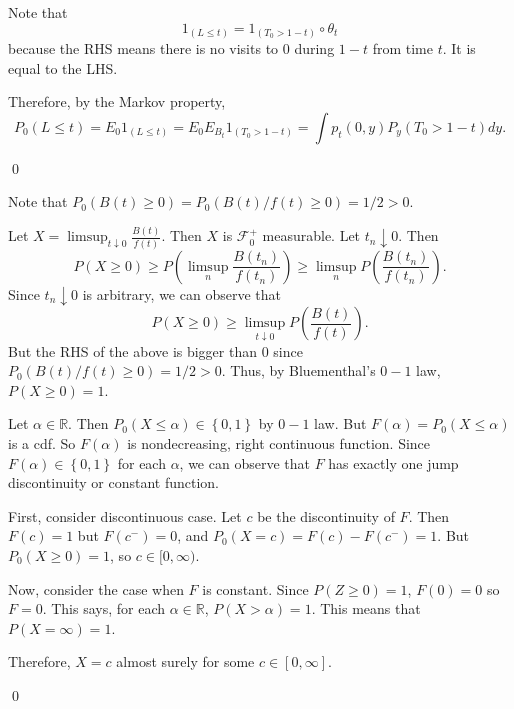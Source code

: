 \begin{problem}[7.2.2] \hfill

	Note that 
	\[
		1_{(L \le t)} = 1_{(T_0 > 1-t)} \circ \theta_t
	\]
	because the RHS means there is no visits to $0$ during $1-t$ from time $t$.
	It is equal to the LHS.

	Therefore, by the Markov property,
	\[
		P_0\left( L \le t \right)
		= E_0 1_{(L\le t)}
		= E_0 E_{B_t}1_{(T_0 > 1-t)}
		= \int p_t(0, y)P_y(T_0 > 1-t) dy.
	\]

	\qed
\end{problem}

\begin{problem}[7.2.4] \hfill

	Note that $P_0 (B(t) \ge 0) = P_0\left( B(t) / f(t) \ge 0 \right) = 1/2 >0$.

	Let $X = \limsup_{ t \downarrow 0} \frac{B(t)}{f(t)}$.
	Then $X$ is $\mathcal{F}_0^+$ measurable.
	Let $t_n \downarrow 0$.
	Then
	\[
		P(X \ge 0) \ge 
		P\left(\limsup_{n} \frac{B(t_n)}{f(t_n)} \right )
		\ge \limsup_n P\left( \frac{B(t_n)}{f(t_n)} \right).
	\]
	Since $t_n \downarrow 0$ is arbitrary, we can observe that
	\[
		P\left( X \ge 0 \right) \ge \limsup_{t\downarrow 0} P\left( \frac{B(t)}{f(t)} \right).
	\]
	But the RHS of the above is bigger than $0$ since $P_0\left( B(t)/f(t) \ge 0 \right) = 1/2 > 0$.
	Thus, by Bluementhal's $0-1$ law, $P(X \ge 0) = 1$.

	Let $\alpha \in \mathbb{R}$.
	Then $P_0(X \le \alpha) \in \left\{ 0, 1 \right\}$ by $0-1$ law.
	But $F(\alpha) = P_0(X \le \alpha)$ is a cdf.
	So $F(\alpha)$ is nondecreasing, right continuous function.
	Since $F(\alpha) \in \left\{ 0, 1 \right\}$ for each $\alpha$, we can observe that
	$F$ has exactly one jump discontinuity or constant function.
	
	First, consider discontinuous case. 
	Let $c$ be the discontinuity of $F$.
	Then $F(c) = 1$ but $F(c^-) = 0$, and $P_0(X = c) = F(c) - F(c^-) = 1$.
	But $P_0(X \ge 0) = 1$, so $c \in [0, \infty)$.

	Now, consider the case when $F$ is constant.
	Since $P(Z \ge 0) = 1$, $F(0) = 0$ so $F = 0$.
	This says, for each $\alpha \in \mathbb{R}$, $P(X > \alpha) = 1$.
	This means that $P(X  = \infty) = 1$.

	Therefore, $X = c$ almost surely for some $c \in [0, \infty]$.

	\qed
\end{problem}

